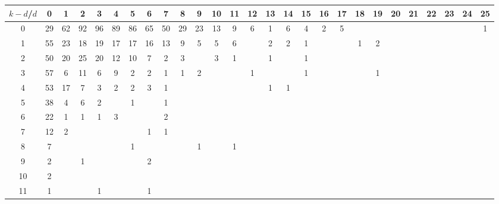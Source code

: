 \documentclass{article}[12pt]
\begin{document}
\begin{landscape}

\begin{table}[h]\footnotesize
{\centering
\begin{tabular}{|c|c|
c|c|c|c|c|c|c|c|c|c|c|c|c|c|c|c|c|c|c|c|c|c|c|c|c|}
  \hline
  $k-d$/$d$ 
 & 0 & 1 & 2 & 3 & 4 & 5 & 6 & 7 & 8 & 9 & 10 & 11 & 12 & 13 & 14 & 15 & 16 & 17 & 18 & 19 & 20 & 21 & 22 & 23 & 24 & 25\\

  \hline
  \hline

0  & 29 & 62 & 92 & 96 & 89 & 86 & 65 & 50 & 29 & 23 & 13 & 9 & 6 & 1 & 6 & 4 & 2 & 5 &  &  &  &  &  &  &  & 1\\

1  & 55 & 23 & 18 & 19 & 17 & 17 & 16 & 13 & 9 & 5 & 5 & 6 &  & 2 & 2 & 1 &  &  & 1 & 2 &  &  &  &  &  & \\

2  & 50 & 20 & 25 & 20 & 12 & 10 & 7 & 2 & 3 &  & 3 & 1 &  & 1 &  & 1 &  &  &  &  &  &  &  &  &  & \\

3  & 57 & 6 & 11 & 6 & 9 & 2 & 2 & 1 & 1 & 2 &  &  & 1 &  &  & 1 &  &  &  & 1 &  &  &  &  &  & \\

4  & 53 & 17 & 7 & 3 & 2 & 2 & 3 & 1 &  &  &  &  &  & 1 & 1 &  &  &  &  &  &  &  &  &  &  & \\

5  & 38 & 4 & 6 & 2 &  & 1 &  & 1 &  &  &  &  &  &  &  &  &  &  &  &  &  &  &  &  &  & \\

6  & 22 & 1 & 1 & 1 & 3 &  &  & 2 &  &  &  &  &  &  &  &  &  &  &  &  &  &  &  &  &  & \\

7  & 12 & 2 &  &  &  &  & 1 & 1 &  &  &  &  &  &  &  &  &  &  &  &  &  &  &  &  &  & \\

8  & 7 &  &  &  &  & 1 &  &  &  & 1 &  & 1 &  &  &  &  &  &  &  &  &  &  &  &  &  & \\

9  & 2 &  & 1 &  &  &  & 2 &  &  &  &  &  &  &  &  &  &  &  &  &  &  &  &  &  &  & \\

10  & 2 &  &  &  &  &  &  &  &  &  &  &  &  &  &  &  &  &  &  &  &  &  &  &  &  & \\

11  & 1 &  &  & 1 &  &  & 1 &  &  &  &  &  &  &  &  &  &  &  &  &  &  &  &  &  &  & \\


\end{tabular}}
\end{table}
\end{landscape}
\end{document}

